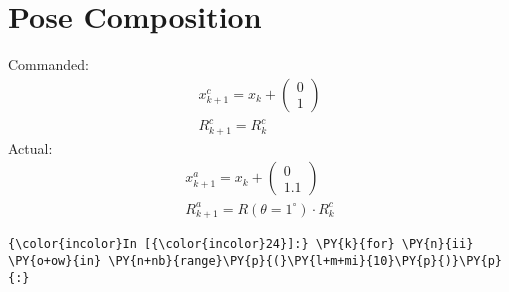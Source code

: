 \documentclass[a4paper]{scrreprt}
\begin{document}
\section{Pose Composition}\label{pose-composition}
Commanded:
\begin{gather}
x^c_{k+1} = x_k + \begin{pmatrix} 0 \\ 1 \end{pmatrix} \\
R^c_{k+1} = R^c_k
\end{gather}
Actual:
\begin{gather}
	x^a_{k+1} = x_k + \begin{pmatrix} 0 \\ 1.1 \end{pmatrix} \\
	R^a_{k+1} = R(\theta = 1^{\circ}) \cdot R^c_k
\end{gather}

\begin{Verbatim}[commandchars=\\\{\}]
{\color{incolor}In [{\color{incolor}24}]:} \PY{k}{for} \PY{n}{ii} \PY{o+ow}{in} \PY{n+nb}{range}\PY{p}{(}\PY{l+m+mi}{10}\PY{p}{)}\PY{p}{:} 

\end{Verbatim}


%
\end{document}
